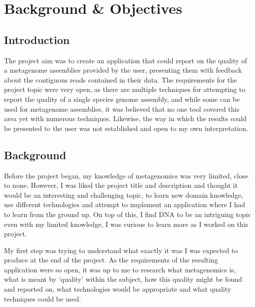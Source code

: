\chapter{Background \& Objectives}


\section{Introduction}
The project aim was to create an application that could report on the quality of a metagenome assemblies  provided by the user, presenting them with feedback about the contiguous reads contained in their data. The requirements for the project topic were very open, as there are multiple techniques for attempting to report the quality of a single species genome assembly, and while some can be used for metagenome assemblies, it was believed that no one tool covered this area yet with numerous techniques. Likewise, the way in which the results could be presented to the user was not established and open to my own interpretation.


\section{Background}
Before the project began, my knowledge of metagenomics was very limited, close to none. However, I was liked the project title and description and thought it would be an interesting and challenging topic, to learn new domain knowledge, use different technologies and attempt to implement an application where I had to learn from the ground up. On top of this, I find DNA to be an intriguing topic even with my limited knowledge, I was curious to learn more as I worked on this project.

My first step was trying to understand what exactly it was I was expected to produce at the end of the project. As the requirements of the resulting application were so open, it was up to me to research what metagenomics is, what is meant by `quality' within the subject, how this quality might be found and reported on, what technologies would be appropriate and what quality techniques could be used.

